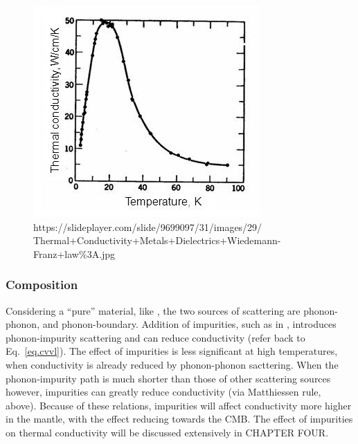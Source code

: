 \begin{figure}[h!]
  \includegraphics[width=\linewidth]{Figures/kappa-temp-dep.png}
  \caption[KAPPA AGAINST TEMP]{https://slideplayer.com/slide/9699097/31/images/29/
  Thermal+Conductivity+Metals+Dielectrics+Wiedemann-Franz+law\%3A.jpg}
  \label{fig:kappa-temp-dep}
\end{figure}


\subsubsection{Composition}

Considering a ``pure'' material, like \mgsios \bdg, the two sources of scattering are phonon-phonon, and phonon-boundary. Addition of impurities, such as in \mgfesios \pv, introduces phonon-impurity scattering and can reduce conductivity (refer back to Eq.~\ref{eq.cvvl}). The effect of impurities is less significant at high temperatures, when conductivity is already reduced by phonon-phonon sacttering. When the phonon-impurity path is much shorter than those of other scattering sources however, impurities can greatly reduce conductivity (via Matthiessen rule, above). Because of these relations, impurities will affect conductivity more higher in the mantle, with the effect reducing towards the CMB. The effect of impurities on thermal conductivity will be discussed extensively in CHAPTER FOUR.



